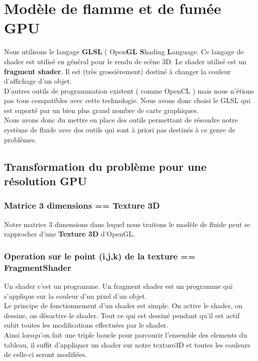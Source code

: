 \documentclass[a4paper,10pt]{article}
\begin{document}
\section{Modèle de flamme et de fumée GPU}
Nous utilisons le langage \textbf{GLSL} ( Open\textbf{GL S}hading \textbf{L}anguage. 
Ce langage de shader est utilisé en général pour le rendu de scène 3D. Le shader utilisé est un \textbf{fragment shader}.
Il est (très grossièrement) destiné à changer la couleur d'affichage d'un objet.\\
D'autres outils de programmation existent ( comme OpenCL ) mais nous n'étions pas tous compatibles avec cette technologie.
Nous avons donc choisi le GLSL qui est suporté par un bien plus grand nombre de carte graphiques.\\

Nous avons donc du mettre en place des outils permettant de résoudre notre système de fluide
avec des outils qui sont à priori pas destinés à ce genre de problèmes.

\subsection{Transformation du problème pour une résolution GPU}

\subsubsection{Matrice 3 dimensions == Texture 3D}
Notre matrice 3 dimensions dans lequel nous traitons le modèle de fluide peut se 
rapprocher d'une \textbf{Texture 3D} d'OpenGL. \\

\subsubsection{Operation sur le point (i,j,k) de la texture == FragmentShader}
Un shader c'est un programme. Un fragment shader est un programme qui s'applique
sur la couleur d'un pixel d'un objet.\\
Le principe de fonctionnement d'un shader est simple. On active le shader, on
dessine, on désactive le shader. Tout ce qui est dessiné pendant qu'il est actif
subit toutes les modifications effectuées par le shader.\\
Ainsi lorsqu'on fait une triple boucle pour parcourir l'ensemble des elements du
tableau, il suffit d'appliquer un shader sur notre texture3D et toutes les couleurs 
de celle-ci seront modifiées.\\
\end{document}
